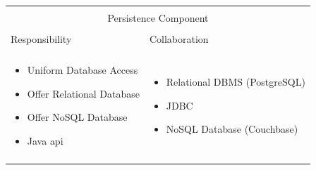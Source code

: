 \vspace{0.5cm} \noindent 
\begin{tabular}{|l|l|}
    \cline{1-2}
    \multicolumn{2}{|c|}{} \\[-0.3cm]
    \multicolumn{2}{|c|}{Persistence Component} \\ 
    \multicolumn{2}{|c|}{} \\[-0.3cm]
    \cline{1-2}
    Responsibility & Collaboration \\
    \cline{1-2}
    & \\[-0.2cm]
    \begin{minipage}{0.47\textwidth}
        \begin{itemize}
          \item Uniform Database Access
          \item Offer Relational Database 
          \item Offer NoSQL Database
          \item Java \gls{api}
        \end{itemize} 
    \end{minipage}
	&
    \begin{minipage}{0.47\textwidth}
        \begin{itemize}
          \item Relational DBMS (PostgreSQL)
          \item JDBC
          \item NoSQL Database (Couchbase)
        \end{itemize} 
    \end{minipage}
	\\ & \\
    \hline
\end{tabular}

